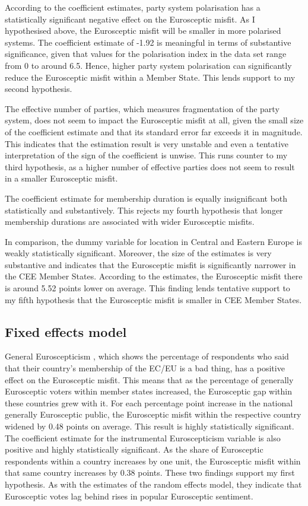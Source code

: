 According to the coefficient estimates, party system polarisation has a statistically significant negative effect on the Eurosceptic misfit. As I hypothesised above, the Eurosceptic misfit will be smaller in more polarised systems. The coefficient estimate of -1.92 is meaningful in terms of substantive significance, given that values for the polarisation index in the data set range from 0 to around 6.5. Hence, higher party system polarisation can significantly reduce the Eurosceptic misfit within a Member State. This lends support to my second hypothesis.

The effective number of parties, which measures fragmentation of the party system, does not seem to impact the Eurosceptic misfit at all, given the small size of the coefficient estimate and that its standard error far exceeds it in magnitude. This indicates that the estimation result is very unstable and even a tentative interpretation of the sign of the coefficient is unwise. This runs counter to my third hypothesis, as a higher number of effective parties does not seem to result in a smaller Eurosceptic misfit.

The coefficient estimate for membership duration is equally insignificant both statistically and substantively. This rejects my fourth hypothesis that longer membership durations are associated with wider Eurosceptic misfits.

In comparison, the dummy variable for location in Central and Eastern Europe is weakly statistically significant. Moreover, the size of the estimates is very substantive and indicates that the Eurosceptic misfit is significantly narrower in the CEE Member States. According to the estimates, the Eurosceptic misfit there is around 5.52 points lower on average. This finding lends tentative support to my fifth hypothesis that the Eurosceptic misfit is smaller in CEE Member States.

\subsection{Fixed effects model}
General Euroscepticism , which shows the percentage of respondents who said that their country's membership of the EC/EU is a bad thing, has a positive effect on the Eurosceptic misfit. This means that as the percentage of generally Eurosceptic voters within member states increased, the Eurosceptic gap within these countries grew with it. For each percentage point increase in the national generally Eurosceptic public, the Eurosceptic misfit within the respective country widened by 0.48 points on average. This result is highly statistically significant.
The coefficient estimate for the instrumental Euroscepticism variable is also positive and highly statistically significant. As the share of Eurosceptic respondents within a country increases by one unit, the Eurosceptic misfit within that same country increases by 0.38 points.
These two findings support my first hypothesis. As with the estimates of the random effects model, they indicate that Eurosceptic votes lag behind rises in popular Eurosceptic sentiment.

